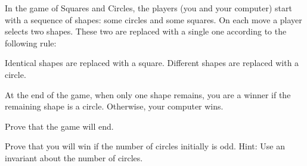 \documentclass[12pt,oneside]{article}
\begin{document}
\begin{problem}{0}

In the game of Squares and Circles, the players (you and your computer) start with a sequence of shapes: some circles and some squares. On each move a player selects two shapes. These two are replaced with a single one according to the following rule:

Identical shapes are replaced with a square. Different shapes are replaced with a circle.

At the end of the game, when only one shape remains, you are a winner if the remaining shape is a circle. Otherwise, your computer wins. 

\bparts

Prove that the game will end.


Prove that you will win if the number of circles initially is odd. Hint: Use an invariant about the number of circles.
 

\eparts

\end{problem}

\newcommand{\card}[1]{\left|#1\right|}


\newpage
\end{document}
